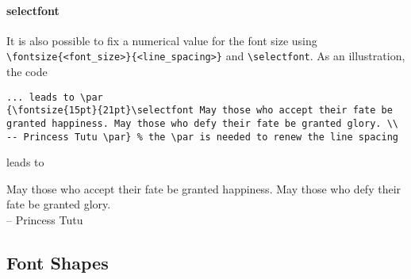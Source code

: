 \paragraph{selectfont}
It is also possible to fix a numerical value for the font size using \texttt{\textbackslash fontsize\{<font\_size>\}\{<line\_spacing>\}} and \texttt{\textbackslash selectfont}. As an illustration, the code
\begin{lstlisting}
... leads to \par
{\fontsize{15pt}{21pt}\selectfont May those who accept their fate be granted happiness. May those who defy their fate be granted glory. \\
-- Princess Tutu \par} % the \par is needed to renew the line spacing
\end{lstlisting}
leads to \par
{\fontsize{15pt}{21pt}\selectfont May those who accept their fate be granted happiness. May those who defy their fate be granted glory. \\
-- Princess Tutu \par}

\subsection{Font Shapes}

